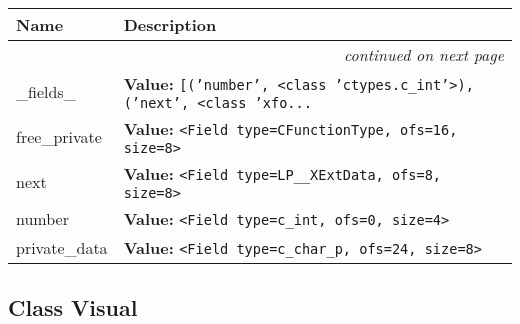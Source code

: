     \vspace{-1cm}
\hspace{\varindent}\begin{longtable}{|p{\varnamewidth}|p{\vardescrwidth}|l}
\cline{1-2}
\cline{1-2} \centering \textbf{Name} & \centering \textbf{Description}& \\
\cline{1-2}
\endhead\cline{1-2}\multicolumn{3}{r}{\small\textit{continued on next page}}\\\endfoot\cline{1-2}
\endlastfoot\raggedright \_\-f\-i\-e\-l\-d\-s\-\_\- & \raggedright \textbf{Value:} 
{\tt \texttt{[}\texttt{(}\texttt{'}\texttt{number}\texttt{'}\texttt{, }{\textless}class 'ctypes.c\_int'{\textgreater}\texttt{)}\texttt{, }\texttt{(}\texttt{'}\texttt{next}\texttt{'}\texttt{, }{\textless}class 'xfo\texttt{...}}&\\
\cline{1-2}
\raggedright f\-r\-e\-e\-\_\-p\-r\-i\-v\-a\-t\-e\- & \raggedright \textbf{Value:} 
{\tt {\textless}Field type=CFunctionType, ofs=16, size=8{\textgreater}}&\\
\cline{1-2}
\raggedright n\-e\-x\-t\- & \raggedright \textbf{Value:} 
{\tt {\textless}Field type=LP\_\_XExtData, ofs=8, size=8{\textgreater}}&\\
\cline{1-2}
\raggedright n\-u\-m\-b\-e\-r\- & \raggedright \textbf{Value:} 
{\tt {\textless}Field type=c\_int, ofs=0, size=4{\textgreater}}&\\
\cline{1-2}
\raggedright p\-r\-i\-v\-a\-t\-e\-\_\-d\-a\-t\-a\- & \raggedright \textbf{Value:} 
{\tt {\textless}Field type=c\_char\_p, ofs=24, size=8{\textgreater}}&\\
\cline{1-2}
\end{longtable}



\subsection{Class Visual}


